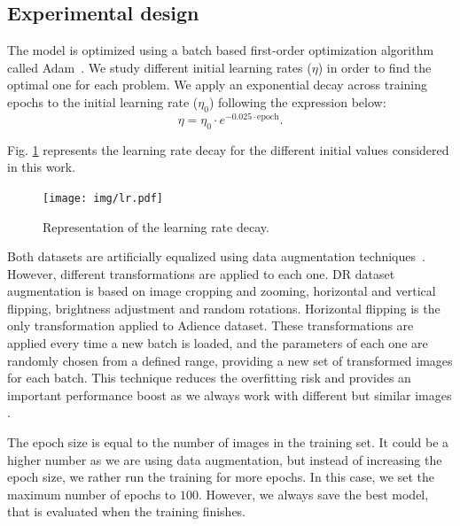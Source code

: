 \documentclass[journal]{IEEEtran}
\begin{document}
	\subsection{Experimental design}
	\label{sect:settings}
	The model is optimized using a batch based first-order optimization algorithm called Adam~\cite{kingma2014adam}. We study different initial learning rates ($\eta$) in order to find the optimal one for each problem. We apply an exponential decay across training epochs to the initial learning rate ($\eta_0$) following the expression below:
	\begin{equation}
		\eta = \eta_0 \cdot e^{-0.025 \cdot \text{epoch}}.
	\end{equation}
	
	Fig. \ref{fig:lrdecay} represents the learning rate decay for the different initial values considered in this work.
	\begin{figure}[!t]
		\centering
		\texttt{[image: img/lr.pdf]}
		\caption{Representation of the learning rate decay.}
		\label{fig:lrdecay}
	\end{figure}
	
	Both datasets are artificially equalized using data augmentation techniques~\cite{van2001art}. However, different transformations are applied to each one. DR dataset augmentation is based on image cropping and zooming, horizontal and vertical flipping, brightness adjustment and random rotations. Horizontal flipping is the only transformation applied to Adience dataset. These transformations are applied every time a new batch is loaded, and the parameters of each one are randomly chosen from a defined range, providing a new set of transformed images for each batch. This technique reduces the overfitting risk and provides an important performance boost as we always work with different but similar images \cite{krizhevsky2012imagenet}.
	
	The epoch size is equal to the number of images in the training set. It could be a higher number as we are using data augmentation, but instead of increasing the epoch size, we rather run the training for more epochs. In this case, we set the maximum number of epochs to $100$. However, we always save the best model, that is evaluated when the training finishes.
	
\end{document}
